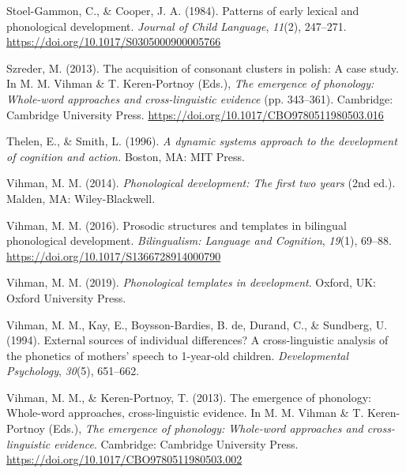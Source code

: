 \documentclass[
  man]{apa6}
\newlength{\cslhangindent}
\newlength{\cslentryspacingunit} %
\newenvironment{CSLReferences}[2] %
 {%
  \setlength{\parindent}{0pt}
  \ifodd #1
  \let\oldpar\par
  \def\par{\hangindent=\cslhangindent\oldpar}
  \fi
  \setlength{\parskip}{#2\cslentryspacingunit}
 }%
 {}
\begin{document}
\begin{CSLReferences}{1}{0}
\leavevmode{}%
Stoel-Gammon, C., \& Cooper, J. A. (1984). Patterns of early lexical and phonological development. \emph{Journal of Child Language}, \emph{11}(2), 247--271. \url{https://doi.org/10.1017/S0305000900005766}

\leavevmode{}%
Szreder, M. (2013). The acquisition of consonant clusters in polish: A case study. In M. M. Vihman \& T. Keren-Portnoy (Eds.), \emph{The emergence of phonology: Whole-word approaches and cross-linguistic evidence} (pp. 343--361). Cambridge: Cambridge University Press. \url{https://doi.org/10.1017/CBO9780511980503.016}

\leavevmode{}%
Thelen, E., \& Smith, L. (1996). \emph{A dynamic systems approach to the development of cognition and action.} Boston, {MA}: {MIT} Press.

\leavevmode{}%
Vihman, M. M. (2014). \emph{Phonological development: The first two years} (2nd ed.). Malden, {MA}: Wiley-Blackwell.

\leavevmode{}%
Vihman, M. M. (2016). Prosodic structures and templates in bilingual phonological development. \emph{Bilingualism: Language and Cognition}, \emph{19}(1), 69--88. \url{https://doi.org/10.1017/S1366728914000790}

\leavevmode{}%
Vihman, M. M. (2019). \emph{Phonological templates in development}. Oxford, {UK}: Oxford University Press.

\leavevmode{}%
Vihman, M. M., Kay, E., Boysson-Bardies, B. de, Durand, C., \& Sundberg, U. (1994). External sources of individual differences? A cross-linguistic analysis of the phonetics of mothers' speech to 1-year-old children. \emph{Developmental Psychology}, \emph{30}(5), 651--662.

\leavevmode{}%
Vihman, M. M., \& Keren-Portnoy, T. (2013). The emergence of phonology: Whole-word approaches, cross-linguistic evidence. In M. M. Vihman \& T. Keren-Portnoy (Eds.), \emph{The emergence of phonology: Whole-word approaches and cross-linguistic evidence}. Cambridge: Cambridge University Press. \url{https://doi.org/10.1017/CBO9780511980503.002}


\end{CSLReferences}
\end{document}

